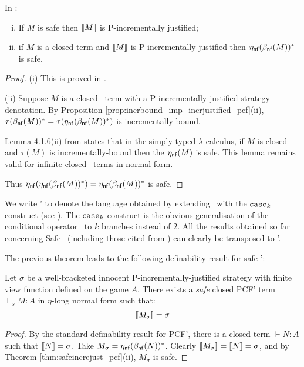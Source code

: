 \begin{theorem}
\label{thm:safeincrejust_pcf} In \pcf:
\begin{enumerate}[(i)]
\item If $M$ is safe then ${[\![ M ]\!]}$ is P-incrementally justified;
\item if $M$ is a closed term and ${[\![ M ]\!]}$ is
  P-incrementally justified then $\eta_{\sf nf}(\beta_{\sf nf}(M))^*$ is safe.
\end{enumerate}
\end{theorem}
\begin{proof}
\noindent(i)
This is proved in  \cite[Theorem 4.2.10]{blumtransfer}.

\noindent(ii) Suppose $M$ is a closed \pcf\ term with a P-incrementally justified strategy denotation. By Proposition \ref{prop:incrbound_imp_incrjustified_pcf}(ii), $\tau(\beta_{\sf nf}(M))^* = \tau(\eta_{\sf nf}(\beta_{\sf nf}(M))^*)$ is incrementally-bound.

Lemma 4.1.6(ii) from \cite{blumtransfer} states that in the simply typed $\lambda$ calculus, if $M$ is closed and $\tau(M)$ is incrementally-bound then the $\eta_{\sf nf}(M)$ is safe.
This lemma remains valid for infinite closed \pcf\ terms in normal form.

Thus $\eta_{\sf nf}(\eta_{\sf nf}(\beta_{\sf nf}(M))^*) = \eta_{\sf nf}(\beta_{\sf nf}(M))^*$ is safe.
\end{proof}


We write \pcf' to denote the language obtained by extending \pcf\
with the $\texttt{case}_k$ construct (see \cite{Abr02}).
The $\texttt{case}_k$ construct is the obvious generalisation of the
conditional operator \pcfcond\ to $k$ branches instead of $2$. All the results obtained so far concerning Safe \pcf\ (including those
cited from \cite{blumtransfer}) can clearly be transposed to \pcf'.

The previous theorem leads to the following definability result for safe \pcf':
\begin{proposition}
\label{prop:safetydefinability}
Let $\sigma$ be a well-bracketed innocent
P-incrementally-justified strategy with finite view function defined on the game $A$. There exists a \emph{safe} closed PCF' term $\vdash_s M : A$ in $\eta$-long normal form such that:
$$ {[\![ M_\sigma ]\!]} = \sigma $$
\end{proposition}
\begin{proof}
By the standard definability result for PCF', there is a closed term $\vdash N : A$ such that ${[\![ N ]\!]} = \sigma$.
Take $M_\sigma = \eta_{\sf nf}(\beta_{\sf nf}(N))^*$.
Clearly ${[\![  M_\sigma ]\!]} = {[\![ N ]\!]} = \sigma$, and by Theorem \ref{thm:safeincrejust_pcf}(ii), $M_\sigma$ is safe.
\end{proof}


